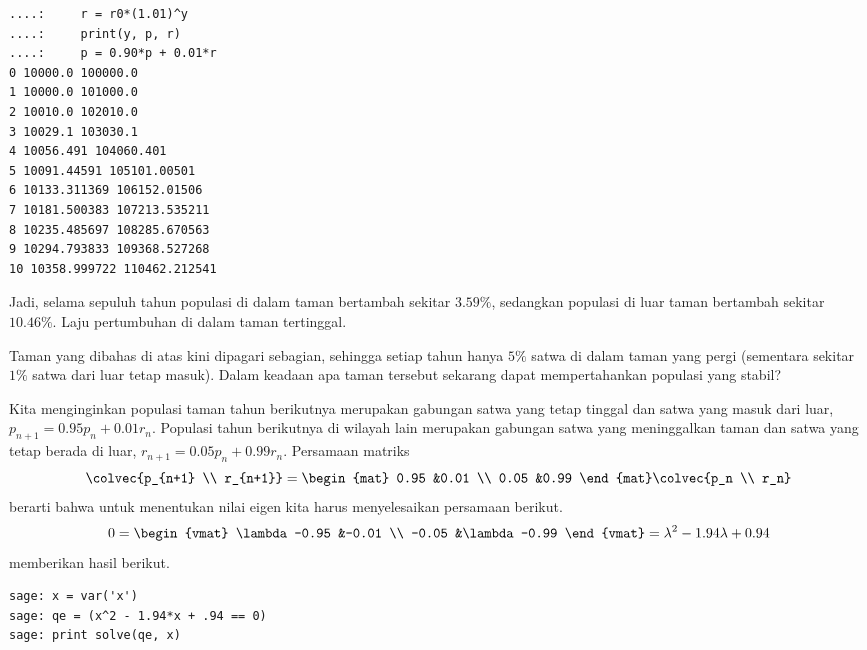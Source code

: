 \begin{exercises}
\begin{answer}
\begin{lstlisting}
....:     r = r0*(1.01)^y
....:     print(y, p, r)
....:     p = 0.90*p + 0.01*r
0 10000.0 100000.0
1 10000.0 101000.0
2 10010.0 102010.0
3 10029.1 103030.1
4 10056.491 104060.401
5 10091.44591 105101.00501
6 10133.311369 106152.01506
7 10181.500383 107213.535211
8 10235.485697 108285.670563
9 10294.793833 109368.527268
10 10358.999722 110462.212541
\end{lstlisting}
      Jadi, selama sepuluh tahun populasi di dalam taman bertambah sekitar
      $3.59\%$, sedangkan populasi di luar taman bertambah sekitar $10.46\%$.
      Laju pertumbuhan di dalam taman tertinggal.
    \end{answer}
  \item 
    Taman yang dibahas di atas kini dipagari sebagian, sehingga setiap tahun
    hanya $5\%$ satwa di dalam taman yang pergi (sementara sekitar $1\%$ satwa
    dari luar tetap masuk). Dalam keadaan apa taman tersebut sekarang dapat
    mempertahankan populasi yang stabil?
    \begin{answer}
      Kita menginginkan populasi taman tahun berikutnya merupakan gabungan
      satwa yang tetap tinggal dan satwa yang masuk dari luar,
      $p_{n+1}=0.95p_n+0.01r_n$.
      Populasi tahun berikutnya di wilayah lain merupakan gabungan satwa yang
      meninggalkan taman dan satwa yang tetap berada di luar,
      $r_{n+1}=0.05p_n+0.99r_n$. 
      Persamaan matriks 
      \begin{equation*}
        \colvec{p_{n+1}  \\ r_{n+1}}
        =
        \begin{mat}
          0.95  &0.01  \\
          0.05  &0.99
        \end{mat}
        \colvec{p_n  \\ r_n}
      \end{equation*}
      berarti bahwa untuk menentukan nilai eigen kita harus menyelesaikan
      persamaan berikut.
      \begin{equation*}
        0
        =
        \begin{vmat}
          \lambda-0.95  &-0.01  \\
          -0.05         &\lambda-0.99
        \end{vmat}
        =\lambda^2-1.94\lambda+0.94
      \end{equation*}
      \Sage{} memberikan hasil berikut.
\begin{lstlisting}
sage: x = var('x')
sage: qe = (x^2 - 1.94*x + .94 == 0)
sage: print solve(qe, x)

\end{lstlisting}
\end{answer}
\end{exercises}
